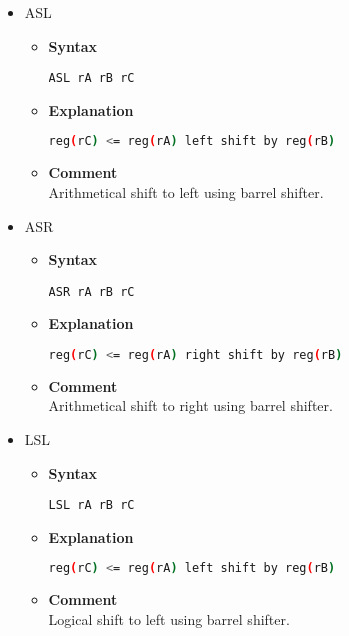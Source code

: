 \begin{itemize}
    \item ASL
    \begin{itemize}
        \item \textbf{Syntax}
        \begin{lstlisting}[language={[markII]Assembler}, frame=single]
    ASL rA rB rC
        \end{lstlisting}
        \item \textbf{Explanation}
        \begin{lstlisting}[language=bash, frame=single]
    reg(rC) <= reg(rA) left shift by reg(rB)
        \end{lstlisting}
        \item \textbf{Comment} \\
    Arithmetical shift to left using barrel shifter.
    \end{itemize}

    \item ASR
    \begin{itemize}
        \item \textbf{Syntax}
        \begin{lstlisting}[language={[markII]Assembler}, frame=single]
    ASR rA rB rC
        \end{lstlisting}
        \item \textbf{Explanation}
        \begin{lstlisting}[language=bash, frame=single]
    reg(rC) <= reg(rA) right shift by reg(rB)
        \end{lstlisting}
        \item \textbf{Comment} \\
    Arithmetical shift to right using barrel shifter.
    \end{itemize}

    \item LSL
    \begin{itemize}
        \item \textbf{Syntax}
        \begin{lstlisting}[language={[markII]Assembler}, frame=single]
    LSL rA rB rC
        \end{lstlisting}
        \item \textbf{Explanation}
        \begin{lstlisting}[language=bash, frame=single]
    reg(rC) <= reg(rA) left shift by reg(rB)
        \end{lstlisting}
        \item \textbf{Comment} \\
    Logical shift to left using barrel shifter.
    \end{itemize}


\end{itemize}
